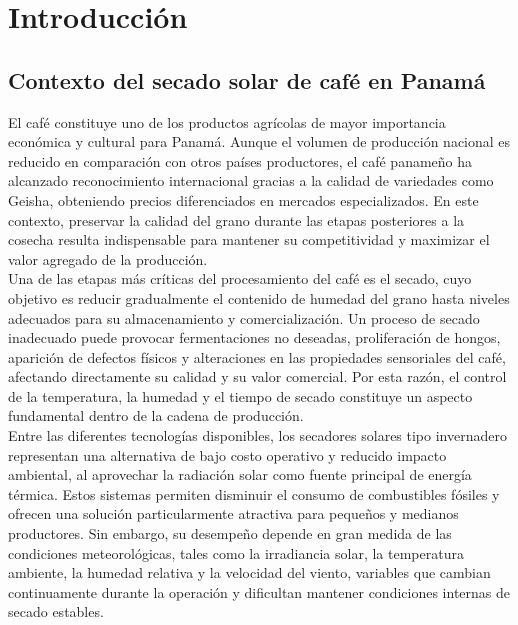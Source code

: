 




\chapter{Introducción}
\label{ch:introduccion}

\section{Contexto del secado solar de café en Panamá}
El café constituye uno de los productos agrícolas de mayor importancia económica y cultural para Panamá. Aunque el volumen de producción nacional es reducido en comparación con otros países productores, el café panameño ha alcanzado reconocimiento internacional gracias a la calidad de variedades como Geisha, obteniendo precios diferenciados en mercados especializados. En este contexto, preservar la calidad del grano durante las etapas posteriores a la cosecha resulta indispensable para mantener su competitividad y maximizar el valor agregado de la producción.\\

Una de las etapas más críticas del procesamiento del café es el secado, cuyo objetivo es reducir gradualmente el contenido de humedad del grano hasta niveles adecuados para su almacenamiento y comercialización. Un proceso de secado inadecuado puede provocar fermentaciones no deseadas, proliferación de hongos, aparición de defectos físicos y alteraciones en las propiedades sensoriales del café, afectando directamente su calidad y su valor comercial. Por esta razón, el control de la temperatura, la humedad y el tiempo de secado constituye un aspecto fundamental dentro de la cadena de producción.\\

Entre las diferentes tecnologías disponibles, los secadores solares tipo invernadero representan una alternativa de bajo costo operativo y reducido impacto ambiental, al aprovechar la radiación solar como fuente principal de energía térmica. Estos sistemas permiten disminuir el consumo de combustibles fósiles y ofrecen una solución particularmente atractiva para pequeños y medianos productores. Sin embargo, su desempeño depende en gran medida de las condiciones meteorológicas, tales como la irradiancia solar, la temperatura ambiente, la humedad relativa y la velocidad del viento, variables que cambian continuamente durante la operación y dificultan mantener condiciones internas de secado estables.\\

